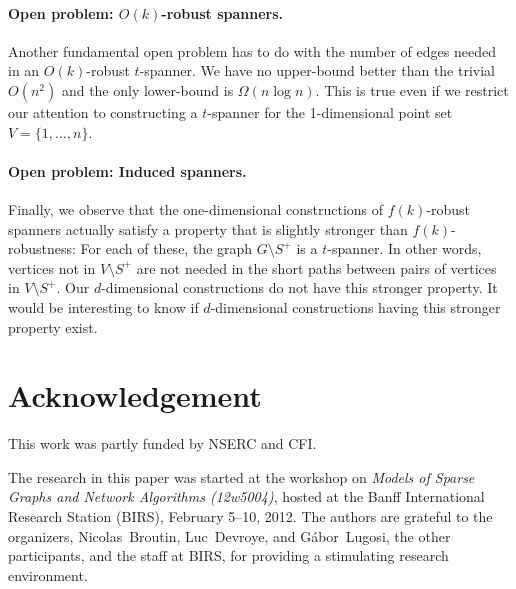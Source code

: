 \documentclass[final]{siamltex}
\begin{document}
\paragraph{Open problem: $O(k)$-robust spanners.}

Another fundamental open problem has to do with the number of edges needed
in an $O(k)$-robust $t$-spanner.  We have no upper-bound better than the
trivial $O(n^2)$ and the only lower-bound is $\Omega(n\log n)$.  This is
true even if we restrict our attention to constructing a $t$-spanner
for the 1-dimensional point set $V=\{1,\ldots,n\}$.

\paragraph{Open problem: Induced spanners.}

Finally, we observe that the one-dimensional constructions of
$f(k)$-robust spanners actually satisfy a property that is slightly
stronger than $f(k)$-robustness:  For each of these, the graph $G\setminus
S^+$ is a $t$-spanner.  In other words, vertices not in $V\setminus
S^+$ are not needed in the short paths between pairs of vertices in
$V\setminus S^+$.  Our $d$-dimensional constructions do not have this
stronger property.  It would be interesting to know if $d$-dimensional
constructions having this stronger property exist.

\section*{Acknowledgement}

This work was partly funded by NSERC and CFI.

The research in this paper was started at the workshop on \emph{Models
of Sparse Graphs and Network Algorithms (12w5004)}, hosted at the
Banff International Research Station (BIRS), February 5--10, 2012.
The authors are grateful to the organizers, \mbox{Nicolas~Broutin},
\mbox{Luc~Devroye}, and \mbox{G\'abor~Lugosi}, the other participants, and the staff
at BIRS, for providing a stimulating research environment.



\end{document}

